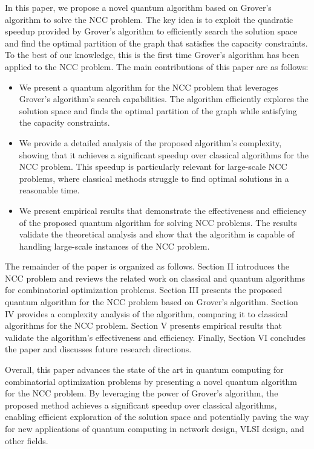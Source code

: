 \indent In this paper, we propose a novel quantum algorithm based on Grover's algorithm to solve the NCC problem. The key idea is to exploit the quadratic speedup provided by Grover's algorithm to efficiently search the solution space and find the optimal partition of the graph that satisfies the capacity constraints. To the best of our knowledge, this is the first time Grover's algorithm has been applied to the NCC problem. The main contributions of this paper are as follows:

\begin{itemize}
    \item We present a quantum algorithm for the NCC problem that leverages Grover's algorithm's search capabilities. The algorithm efficiently explores the solution space and finds the optimal partition of the graph while satisfying the capacity constraints.
    
    \item We provide a detailed analysis of the proposed algorithm's complexity, showing that it achieves a significant speedup over classical algorithms for the NCC problem. This speedup is particularly relevant for large-scale NCC problems, where classical methods struggle to find optimal solutions in a reasonable time.
    
    \item We present empirical results that demonstrate the effectiveness and efficiency of the proposed quantum algorithm for solving NCC problems. The results validate the theoretical analysis and show that the algorithm is capable of handling large-scale instances of the NCC problem.
\end{itemize}

\indent The remainder of the paper is organized as follows. Section II introduces the NCC problem and reviews the related work on classical and quantum algorithms for combinatorial optimization problems. Section III presents the proposed quantum algorithm for the NCC problem based on Grover's algorithm. Section IV provides a complexity analysis of the algorithm, comparing it to classical algorithms for the NCC problem. Section V presents empirical results that validate the algorithm's effectiveness and efficiency. Finally, Section VI concludes the paper and discusses future research directions.

\indent Overall, this paper advances the state of the art in quantum computing for combinatorial optimization problems by presenting a novel quantum algorithm for the NCC problem. By leveraging the power of Grover's algorithm, the proposed method achieves a significant speedup over classical algorithms, enabling efficient exploration of the solution space and potentially paving the way for new applications of quantum computing in network design, VLSI design, and other fields.

